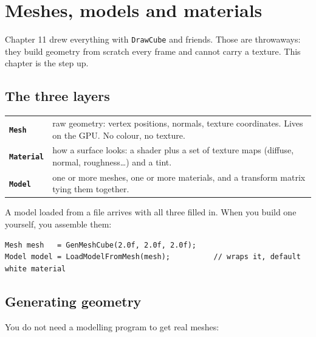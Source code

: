 \chapter{Meshes, models and materials}

Chapter 11 drew everything with \lstinline|DrawCube| and friends. Those are
throwaways: they build geometry from scratch every frame and cannot carry a
texture. This chapter is the step up.

\section{The three layers}

\begin{center}
\begin{tabular}{@{}lp{9.2cm}@{}}
\toprule
\textbf{\lstinline|Mesh|} & raw geometry: vertex positions, normals, texture
coordinates. Lives on the GPU. No colour, no texture. \\[3pt]
\textbf{\lstinline|Material|} & how a surface looks: a shader plus a set of
texture maps (diffuse, normal, roughness\ldots) and a tint. \\[3pt]
\textbf{\lstinline|Model|} & one or more meshes, one or more materials, and a
transform matrix tying them together. \\
\bottomrule
\end{tabular}
\end{center}

A model loaded from a  file arrives with all three filled in. When you
build one yourself, you assemble them:

\begin{lstlisting}
Mesh mesh   = GenMeshCube(2.0f, 2.0f, 2.0f);
Model model = LoadModelFromMesh(mesh);          // wraps it, default white material
\end{lstlisting}

\section{Generating geometry}

You do not need a modelling program to get real meshes:

